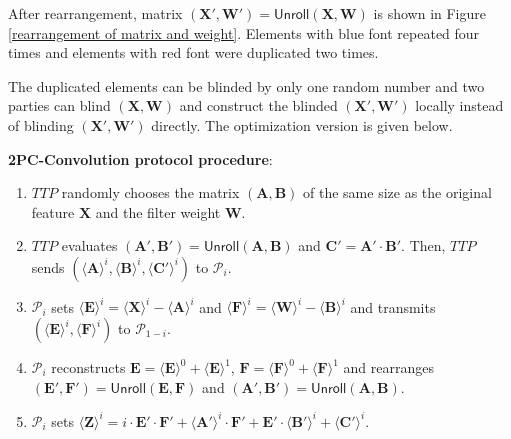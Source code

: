 \documentclass[letterpaper]{article} %
\begin{document}
    After rearrangement, matrix $(\mathbf{X}',\mathbf{W}')=\mathsf{Unroll}(\mathbf{X},\mathbf{W})$
    is shown in Figure \ref{rearrangement of matrix and weight}.
    Elements with blue font repeated four times
    and elements with red font were duplicated two times.

    The duplicated elements can be blinded by only one random number
    and two parties can  blind $(\mathbf{X},\mathbf{W})$ and
    construct the blinded $(\mathbf{X}',\mathbf{W}')$ locally instead of blinding $(\mathbf{X}',\mathbf{W}')$ directly.
    The optimization version is given below.

    \textbf{2PC-Convolution protocol procedure}:
    \begin{enumerate}
        \item $TTP$ randomly chooses the matrix $(\mathbf{A},\mathbf{B})$ of the same size
        as the original feature $\mathbf{X}$ and the filter weight $\mathbf{W}$.
        \item $TTP$ evaluates $( \mathbf{A}',\mathbf{B}')=\mathsf{Unroll}(\mathbf{A},\mathbf{B})$
        and $\mathbf{C}' =\mathbf{A}'\cdot \mathbf{B}' $.
        Then, $TTP$ sends $(\langle \mathbf{A}\rangle ^{i},\langle \mathbf{B}\rangle ^{i},\langle \mathbf{C}'\rangle ^{i})$
        to $\mathcal{P}_{i}$.
        \item $\mathcal{P}_{i}$ sets $\langle \mathbf{E}\rangle ^{i}=\langle \mathbf{X}\rangle ^{i}-
        \langle \mathbf{A}\rangle ^{i}$
        and $\langle \mathbf{F}\rangle ^{i}=\langle \mathbf{W}\rangle ^{i}-\langle \mathbf{B}\rangle ^{i}$
        and transmits $(\langle \mathbf{E}\rangle ^{i},\langle \mathbf{F}\rangle ^{i})$ to $\mathcal{P}_{1-i}$.
        \item $\mathcal{P}_{i}$ reconstructs $\mathbf{E} = \langle \mathbf{E}\rangle ^{0}+\langle \mathbf{E}\rangle ^{1}$,
        $\mathbf{F} = \langle \mathbf{F}\rangle ^{0}+\langle \mathbf{F}\rangle ^{1}$
        and rearranges $(\mathbf{E}',\mathbf{F}')=\mathsf{Unroll}(\mathbf{E},\mathbf{F})$ and $(\mathbf{A}',\mathbf{B}')=\mathsf{Unroll}(\mathbf{A},\mathbf{B})$.
        \item $\mathcal{P}_{i}$ sets
        $\langle \mathbf{Z}\rangle^{i}=i\cdot \mathbf{E}' \cdot \mathbf{F}' +
        \langle \mathbf{A}'\rangle^{i} \cdot \mathbf{F}' + \mathbf{E}' \cdot \langle \mathbf{B}'\rangle^{i} + \langle \mathbf{C}'\rangle^{i}$.

    \end{enumerate}
\end{document}
